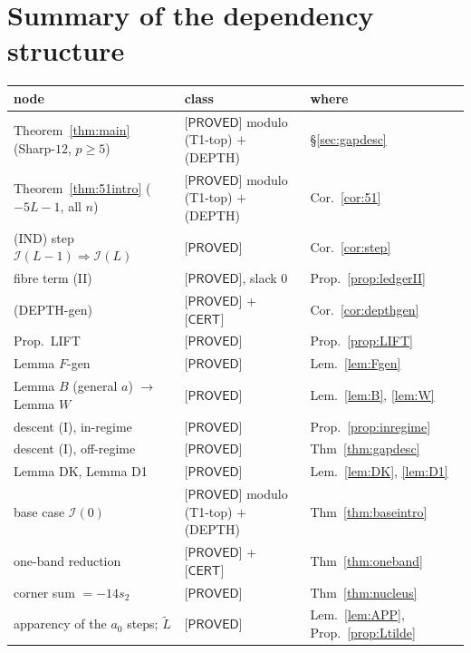 \documentclass[11pt,reqno]{amsart}
\theoremstyle{plain}
\theoremstyle{definition}
\theoremstyle{remark}
\numberwithin{equation}{section}
\newcommand{\PROVED}{\textsf{[PROVED]}}
\newcommand{\CERT}{\textsf{[CERT]}}
\begin{document}
\section{Summary of the dependency structure}\label{sec:summary}

\begin{center}
\footnotesize
\begin{tabular}{@{}lll@{}}
\toprule
node & class & where\\
\midrule
Theorem~\ref{thm:main} (Sharp-$12$, $p\ge5$) & $\PROVED$ modulo (T1-top) $+$ (DEPTH) & \S\ref{sec:gapdesc}\\
\quad Theorem~\ref{thm:51intro} ($-5L-1$, all $n$) & $\PROVED$ modulo (T1-top) $+$ (DEPTH) & Cor.~\ref{cor:51}\\
\quad (IND) step $\mathcal I(L-1)\Rightarrow\mathcal I(L)$ & $\PROVED$ & Cor.~\ref{cor:step}\\
\qquad fibre term (II) & $\PROVED$, slack $0$ & Prop.~\ref{prop:ledgerII}\\
\qquad\quad (DEPTH-gen) & $\PROVED$ + $\CERT$ & Cor.~\ref{cor:depthgen}\\
\qquad\qquad Prop.\ LIFT & $\PROVED$ & Prop.~\ref{prop:LIFT}\\
\qquad\quad Lemma $F$-gen & $\PROVED$ & Lem.~\ref{lem:Fgen}\\
\qquad\qquad Lemma $B$ (general $a$) $\to$ Lemma $W$ & $\PROVED$ & Lem.~\ref{lem:B}, \ref{lem:W}\\
\qquad descent (I), in-regime & $\PROVED$ & Prop.~\ref{prop:inregime}\\
\qquad descent (I), off-regime & $\PROVED$ & Thm~\ref{thm:gapdesc}\\
\qquad\quad Lemma DK, Lemma D1 & $\PROVED$ & Lem.~\ref{lem:DK}, \ref{lem:D1}\\
\quad base case $\mathcal I(0)$ & $\PROVED$ modulo (T1-top) $+$ (DEPTH) & Thm~\ref{thm:baseintro}\\
\qquad one-band reduction & $\PROVED$ + $\CERT$ & Thm~\ref{thm:oneband}\\
\qquad corner sum $=-14s_2$ & $\PROVED$ & Thm~\ref{thm:nucleus}\\
\qquad apparency of the $a_0$ steps; $\tilde L$ & $\PROVED$ & Lem.~\ref{lem:APP}, Prop.~\ref{prop:Ltilde}\\
\midrule

\end{tabular}
\end{center}
\end{document}
